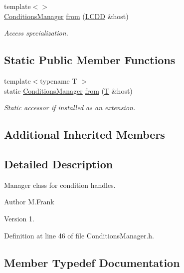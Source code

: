 \begin{DoxyCompactItemize}
{\footnotesize template$<$$>$ }\\\hyperlink{class_d_d4hep_1_1_conditions_1_1_conditions_manager}{Conditions\+Manager} \hyperlink{class_d_d4hep_1_1_conditions_1_1_conditions_manager_a48a6380783e7595983b0ed879046e3ea}{from} (\hyperlink{class_d_d4hep_1_1_geometry_1_1_l_c_d_d}{L\+C\+DD} \&host)
\begin{DoxyCompactList}\small\item\em Access specialization. \end{DoxyCompactList}\end{DoxyCompactItemize}
\subsection*{Static Public Member Functions}
\begin{DoxyCompactItemize}
\item 
{\footnotesize template$<$typename T $>$ }\\static \hyperlink{class_d_d4hep_1_1_conditions_1_1_conditions_manager}{Conditions\+Manager} \hyperlink{class_d_d4hep_1_1_conditions_1_1_conditions_manager_a4b4e31b3c09663517d5274a2506be92a}{from} (\hyperlink{class_t}{T} \&host)
\begin{DoxyCompactList}\small\item\em Static accessor if installed as an extension. \end{DoxyCompactList}\end{DoxyCompactItemize}
\subsection*{Additional Inherited Members}


\subsection{Detailed Description}
Manager class for condition handles. 

\begin{DoxyAuthor}{Author}
M.\+Frank 
\end{DoxyAuthor}
\begin{DoxyVersion}{Version}
1. 
\end{DoxyVersion}


Definition at line 46 of file Conditions\+Manager.\+h.



\subsection{Member Typedef Documentation}
\hypertarget{class_d_d4hep_1_1_conditions_1_1_conditions_manager_a8dd76f9acef2c8d3b7970e266fe7eff6}{}\label{class_d_d4hep_1_1_conditions_1_1_conditions_manager_a8dd76f9acef2c8d3b7970e266fe7eff6} 
